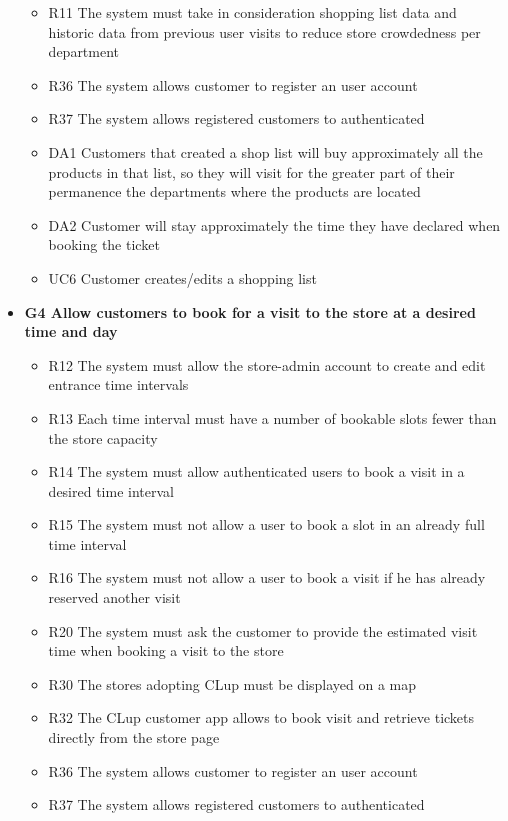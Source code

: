 \begin{itemize}
\begin{itemize}
        \item R11 The system must take in consideration shopping list data and historic data from previous user visits to reduce store crowdedness per department
        \item R36 The system allows customer to register an user account
        \item R37 The system allows registered customers to authenticated
        \medskip
        \item DA1 Customers that created a shop list will buy approximately all the products in that list, so they will visit for the greater part of their permanence the departments where the products are located
        \item DA2 Customer will stay approximately the time they have declared when booking the ticket
        \medskip
        \item UC6 Customer creates/edits a shopping list
    \end{itemize}
    \item \textbf{G4 Allow customers to book for a visit to the store at a desired time and day}
    \begin{itemize}
        \item R12 The system must allow the store-admin account to create and edit entrance time intervals
        \item R13 Each time interval must have a number of bookable slots fewer than the store capacity
        \item R14 The system must allow authenticated users to book a visit in a desired time interval
        \item R15 The system must not allow a user to book a slot in an already full time interval
        \item R16 The system must not allow a user to book a visit if he has already reserved another visit
        \item R20 The system  must ask the customer to provide the estimated visit time when booking a visit to the store
        \item R30 The stores adopting CLup must be displayed on a map
        \item R32 The CLup customer app allows to book visit and retrieve tickets directly from the store page
        \item R36 The system allows customer to register an user account
        \item R37 The system allows registered customers to authenticated
        \medskip

\end{itemize}
\end{itemize}
